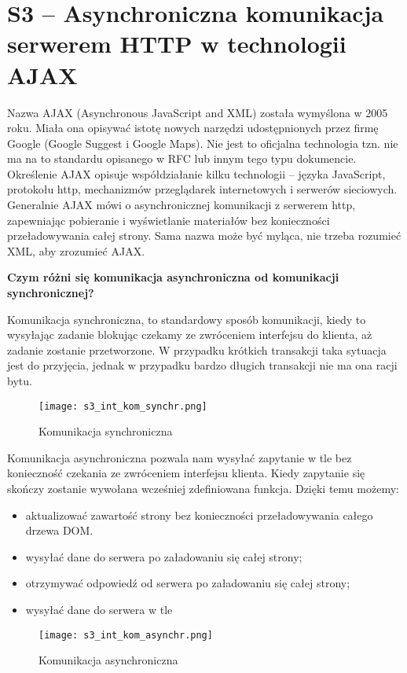 \section{S3 -- Asynchroniczna komunikacja serwerem HTTP w technologii AJAX}

Nazwa AJAX (Asynchronous JavaScript and XML) została wymyślona w 2005 roku. Miała ona opisywać istotę nowych narzędzi udostępnionych przez firmę Google (Google Suggest i Google Maps). Nie jest to oficjalna technologia tzn. nie ma na to standardu opisanego w RFC lub innym tego typu dokumencie. Określenie AJAX opisuje współdziałanie kilku technologii – języka JavaScript, protokołu http, mechanizmów przeglądarek internetowych i serwerów sieciowych. Generalnie AJAX mówi o asynchronicznej komunikacji z serwerem http, zapewniając pobieranie i wyświetlanie materiałów bez konieczności przeładowywania całej strony. Sama nazwa może być myląca, nie trzeba rozumieć XML, aby zrozumieć AJAX.

\textbf{Czym różni się komunikacja asynchroniczna od komunikacji synchronicznej?}

Komunikacja synchroniczna, to standardowy sposób komunikacji, kiedy to wysyłając zadanie blokując czekamy ze zwróceniem interfejsu do klienta, aż zadanie zostanie przetworzone. W przypadku krótkich transakcji taka sytuacja jest do przyjęcia, jednak w przypadku bardzo długich transakcji nie ma ona racji bytu. 
\begin{figure}[H]
\centering
\caption{Komunikacja synchroniczna}
\texttt{[image: s3\_int\_kom\_synchr.png]}
\end{figure}

Komunikacja asynchroniczna pozwala nam wysyłać zapytanie w tle bez konieczność czekania ze zwróceniem interfejsu klienta. Kiedy zapytanie się skończy zostanie wywołana wcześniej zdefiniowana funkcja. Dzięki temu możemy:
\begin{itemize}
\item aktualizować zawartość strony bez konieczności przeładowywania całego drzewa DOM. 
\item wysyłać dane do serwera po załadowaniu się całej strony;
\item otrzymywać odpowiedź od serwera po załadowaniu się całej strony;
\item wysyłać dane do serwera w tle
\end{itemize}

\begin{figure}[H]
\centering
\caption{Komunikacja asynchroniczna}
\texttt{[image: s3\_int\_kom\_asynchr.png]}
\end{figure}

